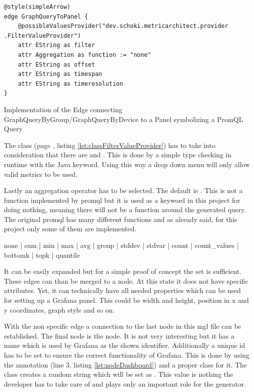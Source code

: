 \begin{listing}[H]
	\begin{verbatim}
@style(simpleArrow)
edge GraphQueryToPanel {
	@possibleValuesProvider("dev.schoki.metricarchitect.provider .FilterValueProvider")
	attr EString as filter
	attr Aggregation as function := "none"
	attr EString as offset
	attr EString as timespan
	attr EString as timeresolution
}
	\end{verbatim}
	\caption{Implementation of the Edge connecting GraphQueryByGroup/GraphQueryByDevice to a Panel symbolizing a PromQL Query}
	\label{lst:GraphQueryToPanel}
\end{listing}

The  class (page \pageref{lst:classFilterValueProvider}, listing \ref{lst:classFilterValueProvider}) has to take into consideration that there are  and . This is done by a simple type checking in runtime with the Java  keyword. Using this way a drop down menu will only allow valid metrics to be used.

Lastly an aggregation operator has to be selected. The default is . This is not a function implemented by \gls{promql} but it is used as a keyword in this project for doing nothing, meaning there will not be a function around the generated query. The original \gls{promql} has many different functions and as already said, for this project only some of them are implemented. 

\begin{center}
	none | sum | min | max | avg | group | stddev | stdvar | count | count\_values | bottomk | topk  | quantile
\end{center}

It can be easily expanded but for a simple proof of concept the set is sufficient. These edges can than be merged to a  node. At this state it does not have specific attributes. Yet, it can technically have all needed properties which can be used for setting up a Grafana panel. This could be width and height, position in x and y coordinates, graph style and so on.

With the non specific edge  a connection to the last node in this \gls{mgl} file can be established. The final node is the  node. It is not very interesting but it has a name which is used by Grafana as the shown identifier. Additionally a unique id has to be set to ensure the correct functionality of Grafana. This is done by using the  annotation (line 3, listing \ref{lst:nodeDashboard}) and a proper class for it. The class  creates a random string which will be set as . This value is nothing the developer has to take care of and plays only an important role for the generator.

